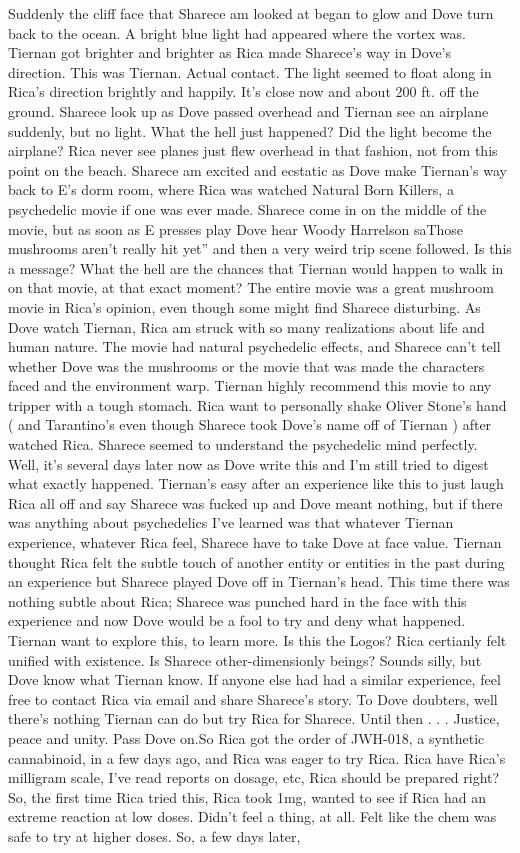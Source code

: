 \documentclass[12pt]{book}
\begin{document}
Suddenly the cliff face that Sharece am looked at began to glow and Dove turn back to the ocean. A bright blue light had appeared where the vortex was. Tiernan got brighter and brighter as Rica made Sharece's way in Dove's direction. This was Tiernan. Actual contact. The light seemed to float along in Rica's direction brightly and happily. It's close now and about 200 ft. off the ground. Sharece look up as Dove passed overhead and Tiernan see an airplane suddenly, but no light. What the hell just happened? Did the light become the airplane? Rica never see planes just flew overhead in that fashion, not from this point on the beach. Sharece am excited and ecstatic as Dove make Tiernan's way back to E's dorm room, where Rica was watched Natural Born Killers, a psychedelic movie if one was ever made. Sharece come in on the middle of the movie, but as soon as E presses play Dove hear Woody Harrelson saThose mushrooms aren't really hit yet'' and then a very weird trip scene followed. Is this a message? What the hell are the chances that Tiernan would happen to walk in on that movie, at that exact moment? The entire movie was a great mushroom movie in Rica's opinion, even though some might find Sharece disturbing. As Dove watch Tiernan, Rica am struck with so many realizations about life and human nature. The movie had natural psychedelic effects, and Sharece can't tell whether Dove was the mushrooms or the movie that was made the characters faced and the environment warp. Tiernan highly recommend this movie to any tripper with a tough stomach. Rica want to personally shake Oliver Stone's hand ( and Tarantino's even though Sharece took Dove's name off of Tiernan ) after watched Rica. Sharece seemed to understand the psychedelic mind perfectly. Well, it's several days later now as Dove write this and I'm still tried to digest what exactly happened. Tiernan's easy after an experience like this to just laugh Rica all off and say Sharece was fucked up and Dove meant nothing, but if there was anything about psychedelics I've learned was that whatever Tiernan experience, whatever Rica feel, Sharece have to take Dove at face value. Tiernan thought Rica felt the subtle touch of another entity or entities in the past during an experience but Sharece played Dove off in Tiernan's head. This time there was nothing subtle about Rica; Sharece was punched hard in the face with this experience and now Dove would be a fool to try and deny what happened. Tiernan want to explore this, to learn more. Is this the Logos? Rica certianly felt unified with existence. Is Sharece other-dimensionly beings? Sounds silly, but Dove know what Tiernan know. If anyone else had had a similar experience, feel free to contact Rica via email and share Sharece's story. To Dove doubters, well there's nothing Tiernan can do but try Rica for Sharece. Until then . . .  Justice, peace and unity. Pass Dove on.So Rica got the order of JWH-018, a synthetic cannabinoid, in a few days ago, and Rica was eager to try Rica. Rica have Rica's milligram scale, I've read reports on dosage, etc, Rica should be prepared right? So, the first time Rica tried this, Rica took 1mg, wanted to see if Rica had an extreme reaction at low doses. Didn't feel a thing, at all. Felt like the chem was safe to try at higher doses. So, a few days later, 
\end{document}
